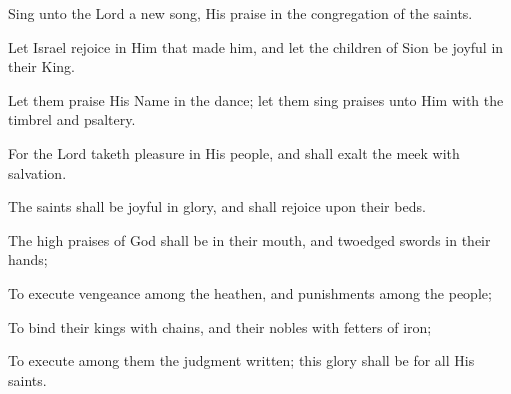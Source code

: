 Sing unto the Lord a new song, His praise in the congregation of the saints.

Let Israel rejoice in Him that made him, and let the children of Sion be joyful in their King.

Let them praise His Name in the dance; let them sing praises unto Him with the timbrel and psaltery.

For the Lord taketh pleasure in His people, and shall exalt the meek with salvation.

The saints shall be joyful in glory, and shall rejoice upon their beds.

The high praises of God shall be in their mouth, and twoedged swords in their hands;

To execute vengeance among the heathen, and punishments among the people;

To bind their kings with chains, and their nobles with fetters of iron;

To execute among them the judgment written; this glory shall be for all His saints.

